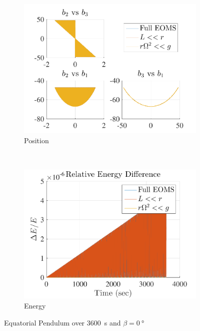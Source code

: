 \documentclass[11pt, reqno]{article}   	%
\begin{document}
\begin{figure}[htbp] 
    \centering 
    \begin{subfigure}[htbp]{0.5\textwidth} 
        \includegraphics[width=\textwidth]{figures/eq_position_2.pdf} 
        \caption{Position } \label{fig:eq_pos_2} 
    \end{subfigure}~ %
    \begin{subfigure}[htbp]{0.5\textwidth} 
        \includegraphics[width=\textwidth]{figures/eq_energy_2.pdf} 
        \caption{Energy } \label{fig:eq_energy_2}
    \end{subfigure}
    \caption{Equatorial Pendulum over \SI{3600}{s} and \( \beta = \SI{0}{\degree} \)}
    \label{fig:eq_pendulum_2} 
\end{figure}

% 
% 
\end{document}
